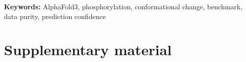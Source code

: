\documentclass[11pt]{article}
\begin{document}
\noindent\textbf{Keywords:} AlphaFold3, phosphorylation,
conformational change, benchmark, data purity, prediction confidence








\clearpage
\section*{Supplementary material}
\setcounter{table}{0}
\renewcommand{\thetable}{S\arabic{table}}

\end{document}
